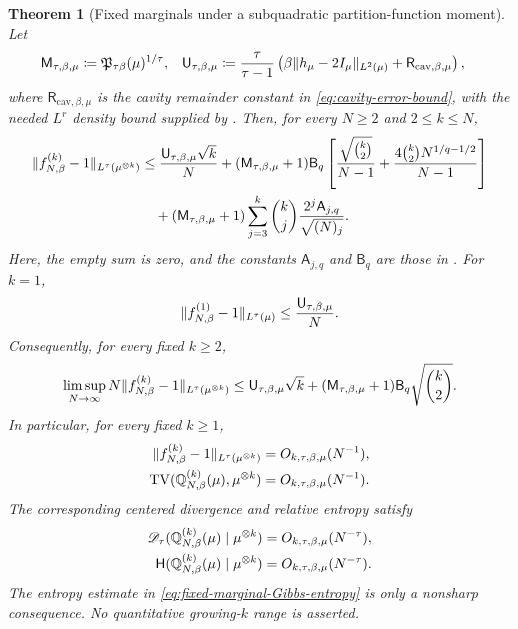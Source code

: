 \documentclass[11pt,reqno]{amsart}
\numberwithin{equation}{section}
\theoremstyle{plain}
\newtheorem{thm}{Theorem}[section]
\theoremstyle{remark}
\DeclarePairedDelimiter{\pa}{\lparen}{\rparen}
\DeclarePairedDelimiter{\norm}{\lVert}{\rVert}
\newcommand{\Q}{{\mathbb{Q}}}
\newcommand{\Hr}{{\mathsf{H}}}
\newcommand{\be}{\beta}
\newcommand{\TV}{\operatorname{TV}}
\begin{document}
\begin{thm}[Fixed marginals under a subquadratic partition-function moment]
Let
\begin{align}\label{eq:fixed-marginal-Gibbs-constants}
 \mathsf M_{\tau,\be,\mu}
 &\coloneqq \mathfrak P_{\tau\be}(\mu)^{1/\tau},
 &
 \mathsf U_{\tau,\be,\mu}
 &\coloneqq
 \frac{\tau}{\tau-1}
 \left(
 \be\norm{h_\mu-2I_\mu}_{L^2(\mu)}
 +\mathsf R_{\mathrm{cav},\be,\mu}
 \right),
\end{align}
where \(\mathsf R_{\mathrm{cav},\be,\mu}\) is the cavity remainder constant in \eqref{eq:cavity-error-bound}, with the needed \(L^r\) density bound supplied by .  Then, for every \(N\ge2\) and \(2\le k\le N\),
\begin{align}\label{eq:fixed-marginal-Gibbs-explicit}
 \norm{f_{N,\be}^{(k)}-1}_{L^\tau(\mu^{\otimes k})}
 &\le \frac{\mathsf U_{\tau,\be,\mu}\sqrt{k}}{N}
 +(\mathsf M_{\tau,\be,\mu}+1)\mathsf B_q
 \left[
 \frac{\sqrt{\binom{k}{2}}}{N-1}
 +\frac{4\binom{k}{2}N^{1/q-1/2}}{N-1}
 \right]\notag\\
 &\quad +(\mathsf M_{\tau,\be,\mu}+1)
 \sum_{j=3}^k\binom{k}{j}
 \frac{2^j\mathsf A_{j,q}}{\sqrt{(N)_j}}.
\end{align}
Here, the empty sum is zero, and the constants \(\mathsf A_{j,q}\) and \(\mathsf B_q\) are those in .  For \(k=1\),
\begin{align}\label{eq:fixed-marginal-Gibbs-one-point}
 \norm{f_{N,\be}^{(1)}-1}_{L^\tau(\mu)}
 \le \frac{\mathsf U_{\tau,\be,\mu}}{N}.
\end{align}
Consequently, for every fixed \(k\ge2\),
\begin{align}\label{eq:fixed-marginal-Gibbs-limsup}
 \limsup_{N\to\infty}
 N\norm{f_{N,\be}^{(k)}-1}_{L^\tau(\mu^{\otimes k})}
 \le
 \mathsf U_{\tau,\be,\mu}\sqrt{k}
 +(\mathsf M_{\tau,\be,\mu}+1)\mathsf B_q
 \sqrt{\binom{k}{2}}.
\end{align}
In particular, for every fixed \(k\ge1\),
\begin{align}\label{eq:fixed-marginal-Gibbs-rates}
 \norm{f_{N,\be}^{(k)}-1}_{L^\tau(\mu^{\otimes k})}
 &=O_{k,\tau,\be,\mu}(N^{-1}),\\
 \TV\pa{\Q_{N,\be}^{(k)}(\mu),\mu^{\otimes k}}
 &=O_{k,\tau,\be,\mu}(N^{-1}).
\end{align}
The corresponding centered divergence and relative entropy satisfy
\begin{align}\label{eq:fixed-marginal-Gibbs-divergences}
 \mathscr D_\tau\pa{\Q_{N,\be}^{(k)}(\mu)\mid\mu^{\otimes k}}
 &=O_{k,\tau,\be,\mu}(N^{-\tau}),\\
 \Hr\pa{\Q_{N,\be}^{(k)}(\mu)\mid\mu^{\otimes k}}
 &=O_{k,\tau,\be,\mu}(N^{-\tau}).
 \label{eq:fixed-marginal-Gibbs-entropy}
\end{align}
The entropy estimate in \eqref{eq:fixed-marginal-Gibbs-entropy} is only a nonsharp consequence.  No quantitative growing-\(k\) range is asserted.
\end{thm}
\end{document}
